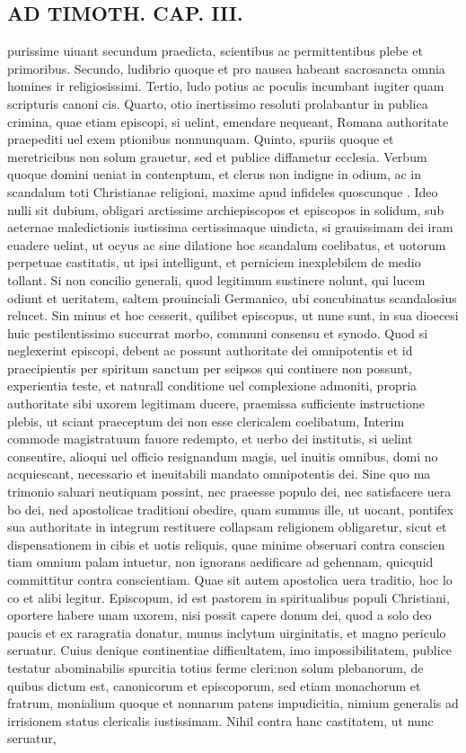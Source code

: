 \documentclass{article}
\begin{document}
\begin{pages}
\section*{AD TIMOTH. CAP. III. }
\marginpar{[ p.495 ]}\pstart purissime uiuant secundum praedicta, scientibus ac permittentibus plebe et primoribus. Secundo, ludibrio quoque et pro nausea habeant sacrosancta omnia homines ir religiosissimi. Tertio, ludo potius ac poculis incumbant iugiter quam scripturis canoni cis. Quarto, otio inertissimo resoluti prolabantur in publica crimina, quae etiam episcopi, si uelint, emendare nequeant, Romana authoritate praepediti uel exem ptionibus nonnunquam. Quinto, spuriis quoque et meretricibus non solum grauetur, sed et publice diffametur ecclesia. Verbum quoque domini ueniat in contenptum, et clerus non indigne in odium, ac in scandalum toti Christianae religioni, maxime apud infideles quoscunque . Ideo nulli sit dubium, obligari arctissime archiepiscopos et episcopos in solidum, sub aeternae maledictionis iustissima certissimaque uindicta, si grauissimam dei iram euadere uelint, ut ocyus ac sine dilatione hoc scandalum coelibatus, et uotorum perpetuae castitatis, ut ipsi intelligunt, et perniciem inexplebilem de medio tollant. Si non concilio generali, quod legitimum sustinere nolunt, qui lucem odiunt et ueritatem, saltem prouinciali Germanico, ubi concubinatus scandalosius relucet. Sin minus et hoc cesserit, quilibet episcopus, ut nune sunt, in sua dioecesi huic pestilentissimo succurrat morbo, communi consensu et synodo. Quod si neglexerint episcopi, debent ac possunt authoritate dei omnipotentis et id praecipientis per spiritum sanctum per seipsos qui continere non possunt, experientia teste, et naturall conditione uel complexione admoniti, propria authoritate sibi uxorem legitimam ducere, praemissa sufficiente instructione plebis, ut sciant praeceptum dei non esse clericalem coelibatum, Interim commode magistratuum fauore redempto, et uerbo dei institutis, si uelint consentire, alioqui uel officio resignandum magis, uel inuitis omnibus, domi no acquiescant, necessario et ineuitabili mandato omnipotentis dei. Sine quo ma trimonio saluari neutiquam possint, nec praeesse populo dei, nec satisfacere uera bo dei, ned apostolicae traditioni obedire, quam summus ille, ut uocant, pontifex sua authoritate in integrum restituere collapsam religionem obligaretur, sicut et dispensationem in cibis et uotis reliquis, quae minime obseruari contra conscien tiam omnium palam intuetur, non ignorans aedificare ad gehennam, quicquid committitur contra conscientiam. Quae sit autem apostolica uera traditio, hoc lo co et alibi legitur. Episcopum, id est pastorem in spiritualibus populi Christiani, oportere habere unam uxorem, nisi possit capere donum dei, quod a solo deo paucis et ex raragratia donatur, munus inclytum uirginitatis, et magno periculo seruatur. Cuius denique continentiae difficultatem, imo impossibilitatem, publice testatur abominabilis spurcitia totius ferme cleri:non solum plebanorum, de quibus dictum est, canonicorum et episcoporum, sed etiam monachorum et fratrum, monialium quoque et nonnarum patens impudicitia, nimium generalis ad irrisionem status clericalis iustissimam. Nihil contra hanc castitatem, ut nunc seruatur, 
\end{pages}
\end{document}
